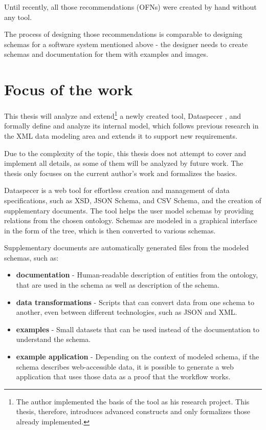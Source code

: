Until recently, all those recommendations (OFNs) were created by hand without any tool.

\smallskip

The process of designing those recommendations is comparable to designing schemas for a software system mentioned above - the designer needs to create schemas and documentation for them with examples and images.

\section*{Focus of the work}

This thesis will analyze and extend\footnote{The author implemented the basis of the tool as his research project. This thesis, therefore, introduces advanced constructs and only formalizes those already implemented.} a newly created tool, Dataspecer \cite{dataspecer}, and formally define and analyze its internal model, which follows previous research in the XML data modeling area and extends it to support new requirements.

Due to the complexity of the topic, this thesis does not attempt to cover and implement all details, as some of them will be analyzed by future work. The thesis only focuses on the current author's work and formalizes the basics.

Dataspecer is a web tool for effortless creation and management of data specifications, such as XSD, JSON Schema, and CSV Schema, and the creation of supplementary documents. The tool helps the user model schemas by providing relations from the chosen ontology. Schemas are modeled in a graphical interface in the form of the tree, which is then converted to various schemas.

Supplementary documents are automatically generated files from the modeled schemas, such as:

\begin{itemize}
    \item \textbf{documentation} - Human-readable description of entities from the ontology, that are used in the schema as well as description of the schema.
    \item \textbf{data transformations} - Scripts that can convert data from one schema to another, even between different technologies, such as JSON and XML.
    \item \textbf{examples} - Small datasets that can be used instead of the documentation to understand the schema.
    \item \textbf{example application} - Depending on the context of modeled schema, if the schema describes web-accessible data, it is possible to generate a web application that uses those data as a proof that the workflow works.
\end{itemize}

